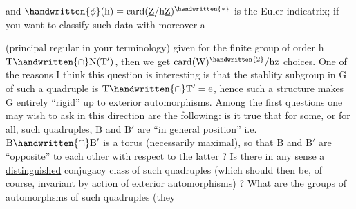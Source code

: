  and $\handwritten{\phi}(\mathrm{h})=\operatorname{card}(\underline{\mathrm{Z}}/\mathrm{h}\underline{\mathrm{Z}})^{\handwritten{*}}$ is the Euler indicatrix; if you want to classify such data with moreover a  (principal regular in your terminology) given for the finite group of order $\mathrm{h}$ $\mathrm{T}\handwritten{\cap}\mathrm{N}(\mathrm{T}')$, then we get $\operatorname{card}(\mathrm{W})^{\handwritten{2}}/\mathrm{hz}$ choices. One of the reasons I think this question is interesting is that the stablity subgroup in $\mathrm{G}$ of such a quadruple is $\mathrm{T}\handwritten{\cap}\mathrm{T}'=\mathrm{e}$,\handwritten{\textsuperscript{*}} hence such a structure makes $\mathrm{G}$ entirely ``rigid'' up to exterior automorphisms. Among the first questions one may wish to ask in this direction are the following: is it true that for some, or for all, such quadruples, $\mathrm{B}$ and $\mathrm{B}'$ are ``in general position'' i.e. $\mathrm{B}\handwritten{\cap}\mathrm{B}'$ is a torus (necessarily maximal), so that $\mathrm{B}$ and $\mathrm{B}'$ are ``opposite'' to each other with respect to the latter ? Is there in any sense a \uline{distinguished} conjugacy class of such quadruples (which should then be, of course, invariant by action of exterior automorphisms) ? What are the groups of automorphsms of such quadruples (they


